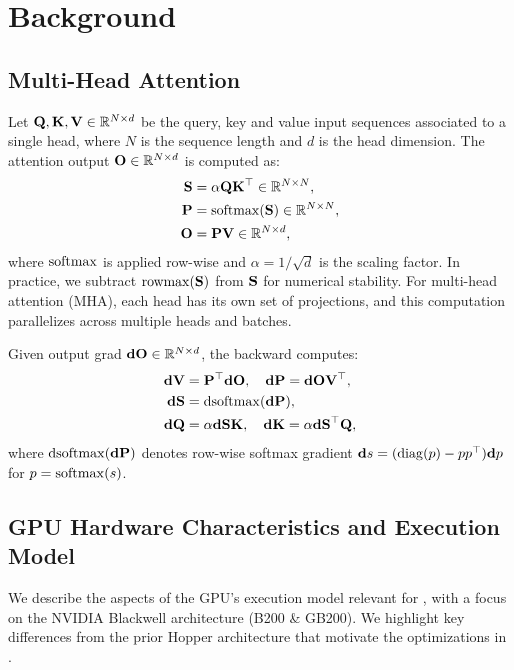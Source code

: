 \section{Background}
\label{sec:background}

\subsection{Multi-Head Attention}
\label{subsec:multi_head_attn}

Let $\mathbf{Q}, \mathbf{K}, \mathbf{V} \in \mathbb{R}^{N \times d}$ be the query, key and value input sequences associated to a single head, where $N$ is the sequence length and $d$ is the head dimension. The attention output $\mathbf{O} \in \mathbb{R}^{N \times d}$ is computed as:
\begin{align*}
  \mathbf{S} &= \alpha \mathbf{Q} \mathbf{K}^\top \in \mathbb{R}^{N \times N}, \\
  \mathbf{P} &= \mathrm{softmax}(\mathbf{S}) \in \mathbb{R}^{N \times N}, \\
  \mathbf{O} &= \mathbf{P}\mathbf{V} \in \mathbb{R}^{N \times d},
\end{align*}
where $\mathrm{softmax}$ is applied row-wise and $\alpha = 1/\sqrt{d}$ is the scaling factor. In practice, we subtract $\mathrm{rowmax}(\mathbf{S})$ from $\mathbf{S}$ for numerical stability.
For multi-head attention (MHA), each head has its own set of projections, and this computation parallelizes across multiple heads and batches.

Given output grad $\mathbf{dO} \in \mathbb{R}^{N \times d}$, the backward computes:
\begin{align*}
  \mathbf{dV} &= \mathbf{P}^\top \mathbf{dO}, \quad \mathbf{dP} = \mathbf{dO} \mathbf{V}^\top, \\
  \mathbf{dS} &= \mathrm{dsoftmax} (\mathbf{dP}), \\
  \mathbf{dQ} &= \alpha \mathbf{dS} \mathbf{K}, \quad \mathbf{dK} = \alpha \mathbf{dS}^\top \mathbf{Q},
\end{align*}
where $\mathrm{dsoftmax}(\mathbf{dP})$ denotes row-wise softmax gradient $\mathbf{d}s = (\mathrm{diag}(p) - p p^\top)\mathbf{d}p$ for $p = \mathrm{softmax}(s)$.

\subsection{GPU Hardware Characteristics and Execution Model}
\label{subsec:hardware}

We describe the aspects of the GPU's execution model relevant for \faf, with a focus on the NVIDIA Blackwell architecture (B200 \& GB200). We highlight key differences from the prior Hopper architecture that motivate the optimizations in \faf.

